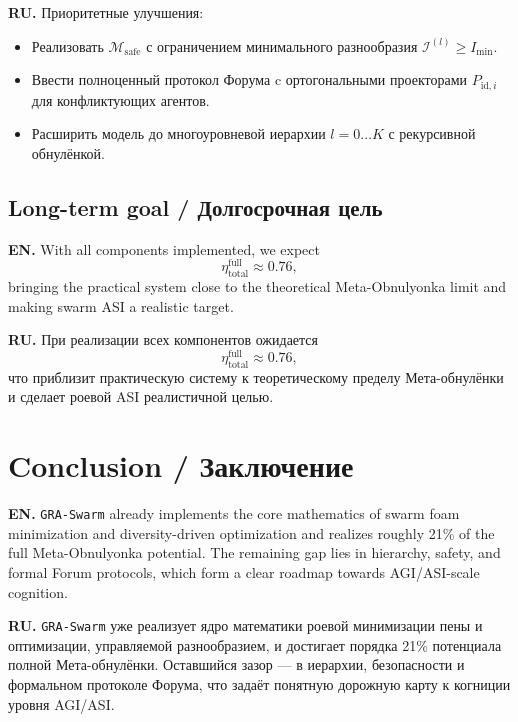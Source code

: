 \documentclass[11pt,a4paper]{article}
\begin{document}
\textbf{RU.}
Приоритетные улучшения:
\begin{itemize}
\item Реализовать $\mathcal{M}_{\text{safe}}$ с ограничением минимального разнообразия $\mathcal{I}^{(l)} \ge I_{\min}$.
\item Ввести полноценный протокол Форума c ортогональными проекторами $P_{\text{id},i}$ для конфликтующих агентов.
\item Расширить модель до многоуровневой иерархии $l=0\ldots K$ с рекурсивной обнулёнкой.
\end{itemize}

\subsection{Long-term goal / Долгосрочная цель}

\textbf{EN.}
With all components implemented, we expect
\begin{equation}
\eta_{\text{total}}^{\text{full}} \approx 0.76,
\end{equation}
bringing the practical system close to the theoretical Meta-Obnulyonka limit and making swarm ASI a realistic target.

\textbf{RU.}
При реализации всех компонентов ожидается
\begin{equation}
\eta_{\text{total}}^{\text{full}} \approx 0.76,
\end{equation}
что приблизит практическую систему к теоретическому пределу Мета-обнулёнки и сделает роевой ASI реалистичной целью.

\section{Conclusion / Заключение}

\textbf{EN.}
\texttt{GRA-Swarm} already implements the core mathematics of swarm foam minimization and diversity-driven optimization and realizes roughly 21\% of the full Meta-Obnulyonka potential.
The remaining gap lies in hierarchy, safety, and formal Forum protocols, which form a clear roadmap towards AGI/ASI-scale cognition.

\textbf{RU.}
\texttt{GRA-Swarm} уже реализует ядро математики роевой минимизации пены и оптимизации, управляемой разнообразием, и достигает порядка 21\% потенциала полной Мета-обнулёнки.
Оставшийся зазор --- в иерархии, безопасности и формальном протоколе Форума, что задаёт понятную дорожную карту к когниции уровня AGI/ASI.
\end{document}
